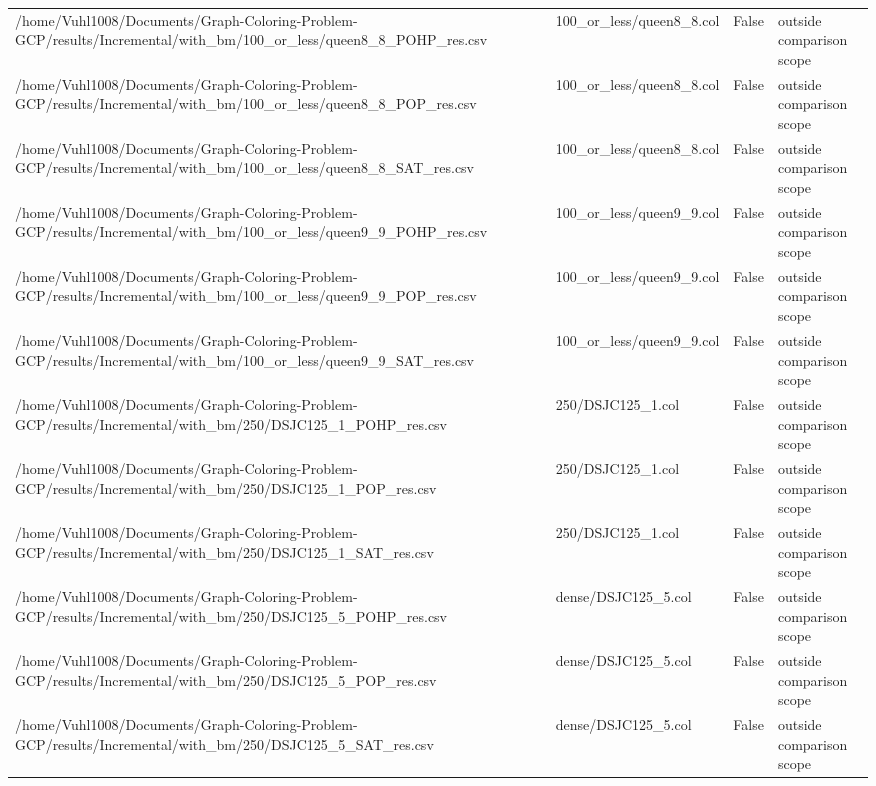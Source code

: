 \begin{table}[htbp]
\begin{tabular}{llll}
/home/Vuhl1008/Documents/Graph-Coloring-Problem-GCP/results/Incremental/with\_bm/100\_or\_less/queen8\_8\_POHP\_res.csv & 100\_or\_less/queen8\_8.col & False & outside comparison scope \\
/home/Vuhl1008/Documents/Graph-Coloring-Problem-GCP/results/Incremental/with\_bm/100\_or\_less/queen8\_8\_POP\_res.csv & 100\_or\_less/queen8\_8.col & False & outside comparison scope \\
/home/Vuhl1008/Documents/Graph-Coloring-Problem-GCP/results/Incremental/with\_bm/100\_or\_less/queen8\_8\_SAT\_res.csv & 100\_or\_less/queen8\_8.col & False & outside comparison scope \\
/home/Vuhl1008/Documents/Graph-Coloring-Problem-GCP/results/Incremental/with\_bm/100\_or\_less/queen9\_9\_POHP\_res.csv & 100\_or\_less/queen9\_9.col & False & outside comparison scope \\
/home/Vuhl1008/Documents/Graph-Coloring-Problem-GCP/results/Incremental/with\_bm/100\_or\_less/queen9\_9\_POP\_res.csv & 100\_or\_less/queen9\_9.col & False & outside comparison scope \\
/home/Vuhl1008/Documents/Graph-Coloring-Problem-GCP/results/Incremental/with\_bm/100\_or\_less/queen9\_9\_SAT\_res.csv & 100\_or\_less/queen9\_9.col & False & outside comparison scope \\
/home/Vuhl1008/Documents/Graph-Coloring-Problem-GCP/results/Incremental/with\_bm/250/DSJC125\_1\_POHP\_res.csv & 250/DSJC125\_1.col & False & outside comparison scope \\
/home/Vuhl1008/Documents/Graph-Coloring-Problem-GCP/results/Incremental/with\_bm/250/DSJC125\_1\_POP\_res.csv & 250/DSJC125\_1.col & False & outside comparison scope \\
/home/Vuhl1008/Documents/Graph-Coloring-Problem-GCP/results/Incremental/with\_bm/250/DSJC125\_1\_SAT\_res.csv & 250/DSJC125\_1.col & False & outside comparison scope \\
/home/Vuhl1008/Documents/Graph-Coloring-Problem-GCP/results/Incremental/with\_bm/250/DSJC125\_5\_POHP\_res.csv & dense/DSJC125\_5.col & False & outside comparison scope \\
/home/Vuhl1008/Documents/Graph-Coloring-Problem-GCP/results/Incremental/with\_bm/250/DSJC125\_5\_POP\_res.csv & dense/DSJC125\_5.col & False & outside comparison scope \\
/home/Vuhl1008/Documents/Graph-Coloring-Problem-GCP/results/Incremental/with\_bm/250/DSJC125\_5\_SAT\_res.csv & dense/DSJC125\_5.col & False & outside comparison scope \\

\end{tabular}
\end{table}
